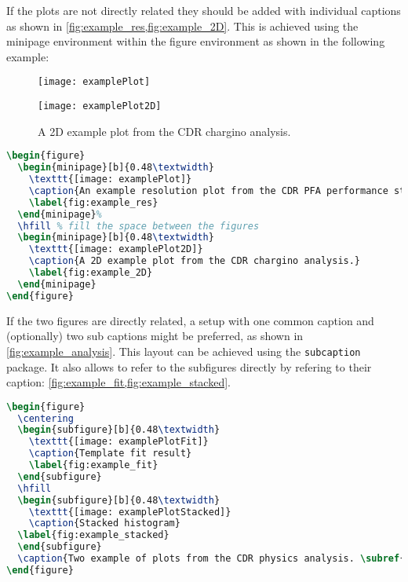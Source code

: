 If the plots are not directly related they should be added with individual captions as shown in \cref{fig:example_res,fig:example_2D}. This is achieved using the minipage environment within the figure environment as shown in the following example:

\begin{figure}
  \begin{minipage}[b]{0.48\textwidth}
    \texttt{[image: examplePlot]}
    \caption{An example resolution plot from the CDR PFA performance studies.}
    \label{fig:example_res}
  \end{minipage}%
  \hfill %
  \begin{minipage}[b]{0.48\textwidth}
    \texttt{[image: examplePlot2D]}
    \caption{A 2D example plot from the CDR chargino analysis.}
    \label{fig:example_2D}
  \end{minipage}
\end{figure}

\begin{lstlisting}[language=TeX]
\begin{figure}
  \begin{minipage}[b]{0.48\textwidth}
    \texttt{[image: examplePlot]}
    \caption{An example resolution plot from the CDR PFA performance studies.}
    \label{fig:example_res}
  \end{minipage}%
  \hfill % fill the space between the figures
  \begin{minipage}[b]{0.48\textwidth}
    \texttt{[image: examplePlot2D]}
    \caption{A 2D example plot from the CDR chargino analysis.}
    \label{fig:example_2D}
  \end{minipage}
\end{figure}
\end{lstlisting}
If the two figures are directly related, a setup with one common caption and (optionally) two sub captions might be preferred, as shown in \cref{fig:example_analysis}. This layout can be achieved using the \texttt{subcaption} package. It also allows to refer to the subfigures directly by refering to their caption: \cref{fig:example_fit,fig:example_stacked}.

\begin{lstlisting}[language=TeX]
\begin{figure}
  \centering
  \begin{subfigure}[b]{0.48\textwidth}
    \texttt{[image: examplePlotFit]}
    \caption{Template fit result}
    \label{fig:example_fit}
  \end{subfigure}
  \hfill
  \begin{subfigure}[b]{0.48\textwidth}
    \texttt{[image: examplePlotStacked]}
    \caption{Stacked histogram}
  \label{fig:example_stacked}
  \end{subfigure}
  \caption{Two example of plots from the CDR physics analysis. \subref{fig:example_fit} a template fit from the squark analysis and \subref{fig:example_stacked} a stacked histogram from the $\PH \to \PQb\PAQb$ analysis.}\label{fig:example_analysis}
\end{figure}
\end{lstlisting}

